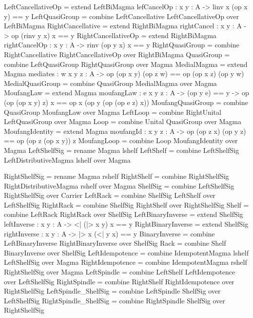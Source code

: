 \begin{togcode} 


LeftCancellativeOp = 
  extend LeftBiMagma {lefCancelOp : {x y : A} -> linv x (op x y) == y}
LeftQuasiGroup = 
  combine LeftCancellative {} LeftCancellativeOp {} over LeftBiMagma
RightCancellative = 
  extend RightBiMagma {rightCancel : {x y : A} -> op (rinv y x) x == y}
RightCancellativeOp = 
  extend RightBiMagma {rightCancelOp : {x y : A} -> rinv (op y x) x  == y}
RightQuasiGroup = 
  combine RightCancellative {} RightCancellativeOp {} over RightBiMagma
QuasiGroup = combine LeftQuasiGroup {} RightQuasiGroup {} over Magma
MedialMagma = 
  extend Magma {mediates : {w x y z : A} -> 
       op (op x y) (op z w) == op (op x z) (op y w)}
MedialQuasiGroup = combine QuasiGroup {} MedialMagma {} over Magma
MoufangLaw = extend Magma 
     {moufangLaw : {e x y z : A} -> (op y e) == y -> 
          op (op (op x y) z) x == op x (op y (op (op e z) x))}
MoufangQuasiGroup = combine QuasiGroup {} MoufangLaw {} over Magma
LeftLoop = combine RightUnital {} LeftQuasiGroup {} over Magma
Loop = combine Unital {} QuasiGroup {} over Magma
MoufangIdentity = extend Magma {moufangId : {x y z : A} -> 
            op (op z x) (op y z) == op (op z (op x y)) z}
MoufangLoop = combine Loop {} MoufangIdentity {} over Magma
LeftShelfSig = rename Magma lshelf 
LeftShelf = 
  combine LeftShelfSig {} LeftDistributiveMagma lshelf over Magma 
\end{togcode} 

\begin{togcode} 


RightShelfSig = rename Magma rshelf
RightShelf = 
  combine RightShelfSig {} RightDistributiveMagma rshelf over Magma
ShelfSig = combine LeftShelfSig {} RightShelfSig {} over Carrier
LeftRack = combine ShelfSig {} LeftShelf {} over LeftShelfSig
RightRack = combine ShelfSig {} RightShelf {} over RightShelfSig 
Shelf = combine LeftRack {} RightRack {} over ShelfSig
LeftBinaryInverse = 
  extend ShelfSig {leftInverse : {x y : A} -> <| (|> x y) x == y}
RightBinaryInverse = 
  extend ShelfSig {rightInverse : {x y : A} -> |> x (<| y x) == y}
BinaryInverse = 
  combine LeftBinaryInverse {} RightBinaryInverse {} over ShelfSig
Rack = combine Shelf {} BinaryInverse {} over ShelfSig
LeftIdempotence = 
  combine IdempotentMagma lshelf LeftShelfSig {} over Magma
RightIdempotence = 
  combine IdempotentMagma rshelf RightShelfSig {} over Magma
  LeftSpindle = 
  combine LeftShelf {} LeftIdempotence {} over LeftShelfSig
RightSpindle = 
  combine RightShelf {} RightIdempotence {} over RightShelfSig
LeftSpindle_ShelfSig  = 
  combine LeftSpindle {} ShelfSig {} over LeftShelfSig
RightSpindle_ShelfSig = 
  combine RightSpindle {} ShelfSig {} over RightShelfSig 
\end{togcode} 

